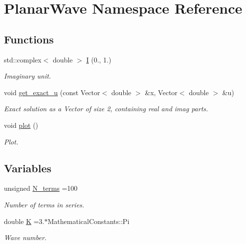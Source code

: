 \hypertarget{namespacePlanarWave}{}\section{Planar\+Wave Namespace Reference}
\label{namespacePlanarWave}
\subsection*{Functions}
\begin{DoxyCompactItemize}
\item 
std\+::complex$<$ double $>$ \hyperlink{namespacePlanarWave_a541691caf71477c8c389062797c0fdab}{I} (0., 1.)
\begin{DoxyCompactList}\small\item\em Imaginary unit. \end{DoxyCompactList}\item 
void \hyperlink{namespacePlanarWave_a00f252bcf0181187c656a58ce36b07b5}{get\+\_\+exact\+\_\+u} (const Vector$<$ double $>$ \&x, Vector$<$ double $>$ \&u)
\begin{DoxyCompactList}\small\item\em Exact solution as a Vector of size 2, containing real and imag parts. \end{DoxyCompactList}\item 
void \hyperlink{namespacePlanarWave_afe1e9812d1b1dc40a89f7a1f18d1165f}{plot} ()
\begin{DoxyCompactList}\small\item\em Plot. \end{DoxyCompactList}\end{DoxyCompactItemize}
\subsection*{Variables}
\begin{DoxyCompactItemize}
\item 
unsigned \hyperlink{namespacePlanarWave_a56abdb2474ccaffd88346ee3607d8672}{N\+\_\+terms} =100
\begin{DoxyCompactList}\small\item\em Number of terms in series. \end{DoxyCompactList}\item 
double \hyperlink{namespacePlanarWave_a1d51c00058fbc80aa9d255fffd92abac}{K} =3.$\ast$Mathematical\+Constants\+::\+Pi
\begin{DoxyCompactList}\small\item\em Wave number. \end{DoxyCompactList}\end{DoxyCompactItemize}


